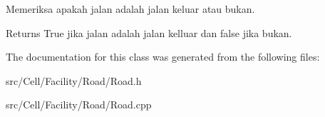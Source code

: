 Memeriksa apakah jalan adalah jalan keluar atau bukan. 

\begin{DoxyReturn}{Returns}
True jika jalan adalah jalan kelluar dan false jika bukan. 
\end{DoxyReturn}


The documentation for this class was generated from the following files\+:\begin{DoxyCompactItemize}
\item 
src/\+Cell/\+Facility/\+Road/Road.\+h\item 
src/\+Cell/\+Facility/\+Road/Road.\+cpp\end{DoxyCompactItemize}
